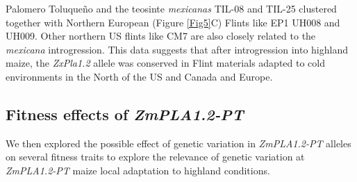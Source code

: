 \documentclass[9pt,twocolumn,twoside]{BioRxiv}
\begin{document}
Palomero Toluqueño and the teosinte \textit{mexicanas} TIL-08 and TIL-25 clustered together with Northern European (Figure \ref{Fig5}C) Flints like EP1 UH008 and UH009. 
Other northern US flints like CM7 are also closely related to the \textit{mexicana} introgression. 
This data suggests that after introgression into highland maize, the \textit{ZxPla1.2} allele was conserved in Flint materials adapted to cold environments in the North of the US and Canada and Europe. 

\subsection{Fitness effects of \textit{ZmPLA1.2-PT}}

We then explored the possible effect of genetic variation in \textit{ZmPLA1.2-PT} alleles on several fitness traits to explore the relevance of genetic variation at \textit{ZmPLA1.2-PT} maize local adaptation to highland conditions. 
\end{document}
